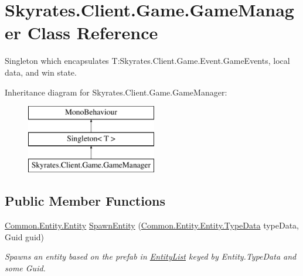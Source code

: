 \hypertarget{class_skyrates_1_1_client_1_1_game_1_1_game_manager}{\section{Skyrates.\-Client.\-Game.\-Game\-Manager Class Reference}
\label{class_skyrates_1_1_client_1_1_game_1_1_game_manager}
}


Singleton which encapsulates T\-:\-Skyrates.\-Client.\-Game.\-Event.\-Game\-Events, local data, and win state.  


Inheritance diagram for Skyrates.\-Client.\-Game.\-Game\-Manager\-:\begin{figure}[H]
\begin{center}
\leavevmode
\includegraphics[height=3.000000cm]{class_skyrates_1_1_client_1_1_game_1_1_game_manager}
\end{center}
\end{figure}
\subsection*{Public Member Functions}
\begin{DoxyCompactItemize}
\item 
\hyperlink{class_skyrates_1_1_common_1_1_entity_1_1_entity}{Common.\-Entity.\-Entity} \hyperlink{class_skyrates_1_1_client_1_1_game_1_1_game_manager_a893f619e6b00db10a0cc40ade9ffd325}{Spawn\-Entity} (\hyperlink{class_skyrates_1_1_common_1_1_entity_1_1_entity_1_1_type_data}{Common.\-Entity.\-Entity.\-Type\-Data} type\-Data, Guid guid)
\begin{DoxyCompactList}\small\item\em Spawns an entity based on the prefab in \hyperlink{class_skyrates_1_1_client_1_1_game_1_1_game_manager_a6cd625a0d48f736b04afc3ec98e4ed53}{Entity\-List} keyed by Entity.\-Type\-Data and some Guid. \end{DoxyCompactList}\end{DoxyCompactItemize}
